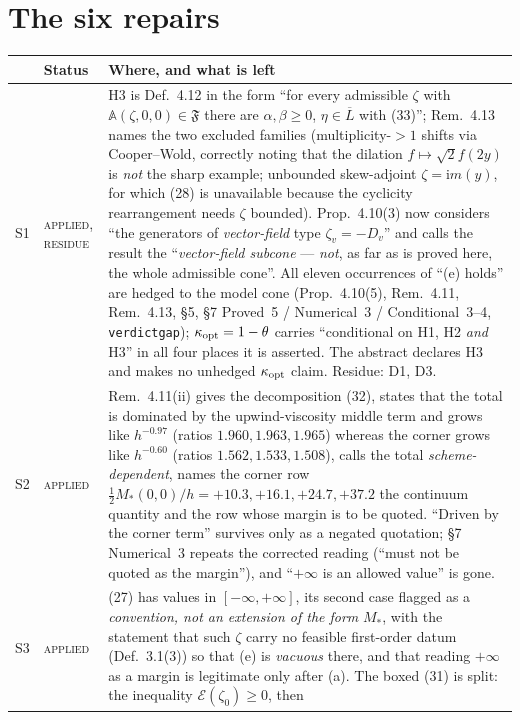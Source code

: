 \documentclass[11pt]{article}
\newcommand{\Aop}{\mathbb A}
\newcommand{\vA}{\textcolor{okgreen}{\textsc{applied}}}
\newcommand{\vP}{\textcolor{orange!80!black}{\textsc{applied, residue}}}
\begin{document}
\section{The six repairs}\label{sec:s16}
{\footnotesize\begin{tabular}{@{}llp{9.9cm}@{}}
\toprule
 & Status & Where, and what is left\\
\midrule
S1 & \vP & H3 is Def.~4.12 in the form ``for every admissible $\zeta$ with
 $\Aop(\zeta,0,0)\in\mathfrak F$ there are $\alpha,\beta\ge0$, $\eta\in\overline L$ with
 (33)''; Rem.~4.13 names the two excluded families (multiplicity-$>1$ shifts via
 Cooper--Wold, correctly noting that the dilation $f\mapsto\sqrt2f(2y)$ is \emph{not} the
 sharp example; unbounded skew-adjoint $\zeta=\mathrm im(y)$, for which (28) is unavailable
 because the cyclicity rearrangement needs $\zeta$ bounded).  Prop.~4.10(3) now considers
 ``the generators of \emph{vector-field} type $\zeta_v=-D_v$'' and calls the result the
 ``\emph{vector-field subcone} --- \emph{not}, as far as is proved here, the whole
 admissible cone''.  All eleven
 occurrences of ``(e) holds'' are hedged to the model cone (Prop.~4.10(5), Rem.~4.11,
 Rem.~4.13, \S5, \S7 Proved~5 / Numerical~3 / Conditional~3--4, \texttt{verdictgap});
 $\kappa_{\rm opt}=1-\theta$ carries ``conditional on H1, H2 \emph{and} H3'' in all four
 places it is asserted.  The abstract declares H3 and makes no unhedged
 $\kappa_{\rm opt}$ claim.  Residue: D1, D3.\\
S2 & \vA & Rem.~4.11(ii) gives the decomposition (32), states that the
 total is dominated by the upwind-viscosity middle term and grows like $h^{-0.97}$ (ratios
 $1.960,1.963,1.965$) whereas the corner grows like $h^{-0.60}$ (ratios
 $1.562,1.533,1.508$), calls the total \emph{scheme-dependent}, names the corner row
 $\frac12M_*(0,0)/h=+10.3,+16.1,+24.7,+37.2$ the continuum quantity and the row whose
 margin is to be quoted.  ``Driven by the corner term'' survives only as a negated
 quotation; \S7 Numerical~3 repeats the corrected reading (``must not be quoted as the
 margin''), and ``$+\infty$ is an allowed value'' is gone.\\
S3 & \vA & (27) has values in $[-\infty,+\infty]$, its second case flagged as a
 \emph{convention, not an extension of the form} $M_*$, with the statement that
 such $\zeta$ carry no feasible first-order datum (Def.~3.1(3)) so that (e) is
 \emph{vacuous} there, and that reading $+\infty$ as a margin is legitimate only after (a).
 The boxed (31) is split: the inequality $\mathcal E(\zeta_0)\ge0$, then

\end{tabular}}
\end{document}
